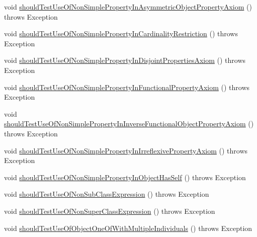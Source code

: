 \begin{DoxyCompactItemize}
\item 
void \hyperlink{classorg_1_1semanticweb_1_1owlapi_1_1contract_1_1_contract_owlapi_profiles_test_a9e2bb39b4884768a74f181baafb25f5f}{should\-Test\-Use\-Of\-Non\-Simple\-Property\-In\-Asymmetric\-Object\-Property\-Axiom} ()  throws Exception 
\item 
void \hyperlink{classorg_1_1semanticweb_1_1owlapi_1_1contract_1_1_contract_owlapi_profiles_test_ab24b4f5ff33eee3cee87f46e5b76fce6}{should\-Test\-Use\-Of\-Non\-Simple\-Property\-In\-Cardinality\-Restriction} ()  throws Exception 
\item 
void \hyperlink{classorg_1_1semanticweb_1_1owlapi_1_1contract_1_1_contract_owlapi_profiles_test_a3a90c889af16f331291a3ba9c02b8e89}{should\-Test\-Use\-Of\-Non\-Simple\-Property\-In\-Disjoint\-Properties\-Axiom} ()  throws Exception 
\item 
void \hyperlink{classorg_1_1semanticweb_1_1owlapi_1_1contract_1_1_contract_owlapi_profiles_test_a8c7004346ef0b61a4bb52770751b9658}{should\-Test\-Use\-Of\-Non\-Simple\-Property\-In\-Functional\-Property\-Axiom} ()  throws Exception 
\item 
void \hyperlink{classorg_1_1semanticweb_1_1owlapi_1_1contract_1_1_contract_owlapi_profiles_test_a46a97b63016aa582494e09b51d2630f6}{should\-Test\-Use\-Of\-Non\-Simple\-Property\-In\-Inverse\-Functional\-Object\-Property\-Axiom} ()  throws Exception 
\item 
void \hyperlink{classorg_1_1semanticweb_1_1owlapi_1_1contract_1_1_contract_owlapi_profiles_test_a7d5ccd0a49b4eefc1ee78ea96d083dcb}{should\-Test\-Use\-Of\-Non\-Simple\-Property\-In\-Irreflexive\-Property\-Axiom} ()  throws Exception 
\item 
void \hyperlink{classorg_1_1semanticweb_1_1owlapi_1_1contract_1_1_contract_owlapi_profiles_test_a2f55baf6ffd5b99e2643cce62564b30f}{should\-Test\-Use\-Of\-Non\-Simple\-Property\-In\-Object\-Has\-Self} ()  throws Exception 
\item 
void \hyperlink{classorg_1_1semanticweb_1_1owlapi_1_1contract_1_1_contract_owlapi_profiles_test_aa3f45fba128d5b502b209c8b7fca4226}{should\-Test\-Use\-Of\-Non\-Sub\-Class\-Expression} ()  throws Exception 
\item 
void \hyperlink{classorg_1_1semanticweb_1_1owlapi_1_1contract_1_1_contract_owlapi_profiles_test_afc327c386a8d102f037bd350bb0b2672}{should\-Test\-Use\-Of\-Non\-Super\-Class\-Expression} ()  throws Exception 
\item 
void \hyperlink{classorg_1_1semanticweb_1_1owlapi_1_1contract_1_1_contract_owlapi_profiles_test_aa2de5f2d22190a0e1b907c8c293c56d9}{should\-Test\-Use\-Of\-Object\-One\-Of\-With\-Multiple\-Individuals} ()  throws Exception 

\end{DoxyCompactItemize}
